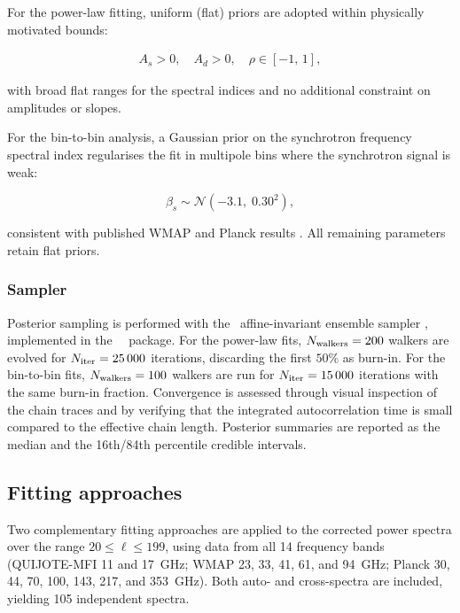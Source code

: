 For the power-law fitting, uniform (flat) priors are adopted within physically motivated bounds:

\begin{gather*}
A_s > 0, \quad A_d > 0, \quad \rho \in [-1,\, 1],
\end{gather*}

with broad flat ranges for the spectral indices and no additional constraint on amplitudes or slopes.

For the bin-to-bin analysis, a Gaussian prior on the synchrotron frequency spectral index regularises the fit in multipole bins where the synchrotron signal is weak:

\begin{equation}
\beta_s \sim \mathcal{N}(-3.1,\; 0.30^2),
\end{equation}

consistent with published WMAP and Planck results \citep{Planck_2016XXX}. All remaining parameters retain flat priors.

\subsubsection{Sampler}

Posterior sampling is performed with the \emcee\ affine-invariant ensemble sampler \citep{Emcee}, implemented in the \emcee\ \python\ package. For the power-law fits, $N_{\rm walkers} = 200$ walkers are evolved for $N_{\rm iter} = 25\,000$ iterations, discarding the first $50\%$ as burn-in. For the bin-to-bin fits, $N_{\rm walkers} = 100$ walkers are run for $N_{\rm iter} = 15\,000$ iterations with the same burn-in fraction. Convergence is assessed through visual inspection of the chain traces and by verifying that the integrated autocorrelation time is small compared to the effective chain length. Posterior summaries are reported as the median and the 16th/84th percentile credible intervals.

\subsection{Fitting approaches}
\label{sec:fitting_methods}

Two complementary fitting approaches are applied to the corrected power spectra over the range $20 \leq \ell \leq 199$, using data from all 14 frequency bands (QUIJOTE-MFI 11 and 17~GHz; WMAP 23, 33, 41, 61, and 94~GHz; Planck 30, 44, 70, 100, 143, 217, and 353~GHz). Both auto- and cross-spectra are included, yielding 105 independent spectra.

